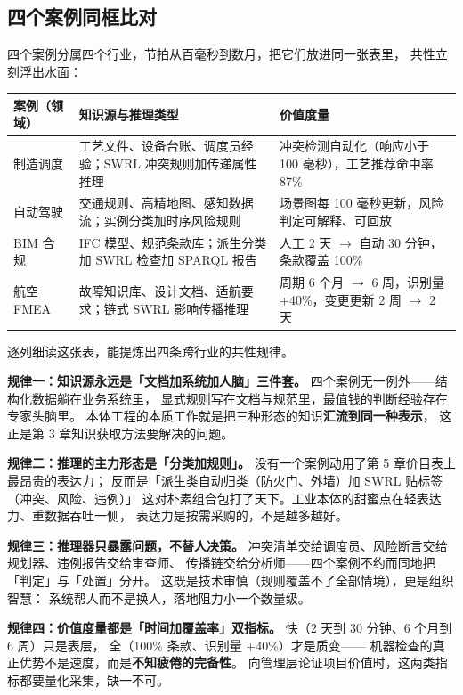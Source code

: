 \subsection{四个案例同框比对}

四个案例分属四个行业，节拍从百毫秒到数月，把它们放进同一张表里，
共性立刻浮出水面：

\begin{center}
\begin{tabularx}{\linewidth}{@{}lXX@{}}
\toprule
\textbf{案例（领域）} & \textbf{知识源与推理类型} & \textbf{价值度量} \\
\midrule
制造调度 & 工艺文件、设备台账、调度员经验；SWRL 冲突规则加传递属性推理 & 冲突检测自动化（响应小于 100 毫秒），工艺推荐命中率 87\% \\
自动驾驶 & 交通规则、高精地图、感知数据流；实例分类加时序风险规则 & 场景图每 100 毫秒更新，风险判定可解释、可回放 \\
BIM 合规 & IFC 模型、规范条款库；派生分类加 SWRL 检查加 SPARQL 报告 & 人工 2 天 \(\rightarrow\) 自动 30 分钟，条款覆盖 100\% \\
航空 FMEA & 故障知识库、设计文档、适航要求；链式 SWRL 影响传播推理 & 周期 6 个月 \(\rightarrow\) 6 周，识别量 +40\%，变更更新 2 周 \(\rightarrow\) 2 天 \\
\bottomrule
\end{tabularx}
\end{center}

逐列细读这张表，能提炼出四条跨行业的共性规律。

\textbf{规律一：知识源永远是「文档加系统加人脑」三件套。}
四个案例无一例外——结构化数据躺在业务系统里，
显式规则写在文档与规范里，最值钱的判断经验存在专家头脑里。
本体工程的本质工作就是把三种形态的知识\textbf{汇流到同一种表示}，
这正是第 3 章知识获取方法要解决的问题。

\textbf{规律二：推理的主力形态是「分类加规则」。}
没有一个案例动用了第 5 章价目表上最昂贵的表达力；
反而是「派生类自动归类（防火门、外墙）加 SWRL 贴标签（冲突、风险、违例）」
这对朴素组合包打了天下。工业本体的甜蜜点在轻表达力、重数据吞吐一侧，
表达力是按需采购的，不是越多越好。

\textbf{规律三：推理器只暴露问题，不替人决策。}
冲突清单交给调度员、风险断言交给规划器、违例报告交给审查师、
传播链交给分析师——四个案例不约而同地把「判定」与「处置」分开。
这既是技术审慎（规则覆盖不了全部情境），更是组织智慧：
系统帮人而不是换人，落地阻力小一个数量级。

\textbf{规律四：价值度量都是「时间加覆盖率」双指标。}
快（2 天到 30 分钟、6 个月到 6 周）只是表层，
全（100\% 条款、识别量 +40\%）才是质变——
机器检查的真正优势不是速度，而是\textbf{不知疲倦的完备性}。
向管理层论证项目价值时，这两类指标都要量化采集，缺一不可。


